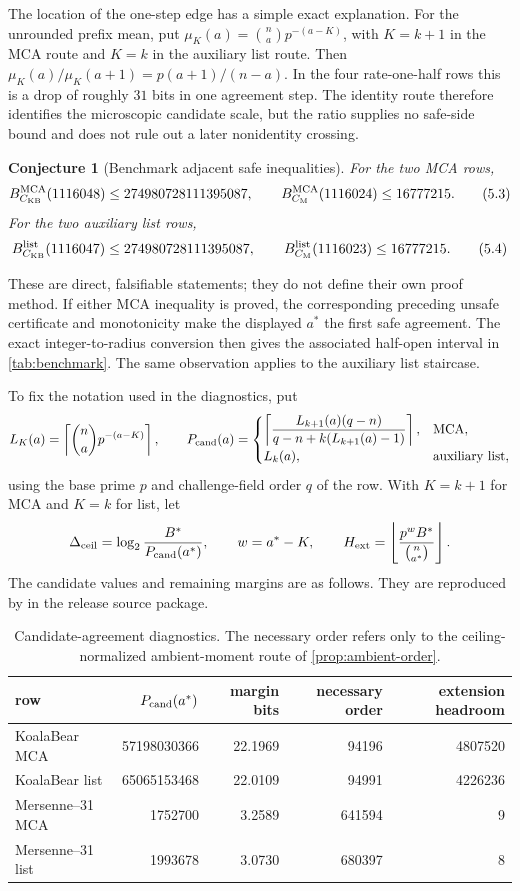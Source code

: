 \documentclass[a4paper,11pt]{amsart}
\newtheorem{conjecture}[theorem]{Conjecture}
\theoremstyle{remark}
\DeclareMathOperator{\MCA}{MCA}
\newcommand{\floor}[1]{\left\lfloor#1\right\rfloor}
\newcommand{\ceil}[1]{\left\lceil#1\right\rceil}
\begin{document}
The location of the one-step edge has a simple exact explanation.  For the
unrounded prefix mean, put
\(\mu_K(a)=\binom na p^{-(a-K)}\), with \(K=k+1\) in the MCA route and
\(K=k\) in the auxiliary list route.  Then
\(\mu_K(a)/\mu_K(a+1)=p(a+1)/(n-a)\).  In the four rate-one-half rows this
is a drop of roughly \(31\) bits in one agreement step.  The identity route
therefore identifies the microscopic candidate scale, but the ratio supplies
no safe-side bound and does not rule out a later nonidentity crossing.

\begin{conjecture}[Benchmark adjacent safe inequalities]\label{conj:benchmark}
For the two MCA rows,
\[
 B_{C_{\rm KB}}^{\MCA}(1116048)\le274980728111395087,
 \qquad
 B_{C_{\rm M}}^{\MCA}(1116024)\le16777215.           \tag{5.3}\label{eq:mca-adjacent}
\]
For the two auxiliary list rows,
\[
 B_{C_{\rm KB}}^{\rm list}(1116047)\le274980728111395087,
 \qquad
 B_{C_{\rm M}}^{\rm list}(1116023)\le16777215.      \tag{5.4}\label{eq:list-adjacent}
\]
\end{conjecture}

These are direct, falsifiable statements; they do not define their own proof
method.  If either MCA inequality is proved, the corresponding preceding
unsafe certificate and monotonicity make the displayed \(a^*\) the first safe
agreement.  The exact integer-to-radius conversion then gives the associated
half-open interval in \cref{tab:benchmark}.  The same observation applies to
the auxiliary list staircase.

To fix the notation used in the diagnostics, put
\[
 L_K(a)=\ceil{\binom na p^{-(a-K)}},\qquad
 P_{\rm cand}(a)=
 \begin{cases}
 \displaystyle\ceil{\frac{L_{k+1}(a)(q-n)}
 {q-n+k(L_{k+1}(a)-1)}},&\text{MCA},\\[6pt]
 L_k(a),&\text{auxiliary list},
 \end{cases}
\]
using the base prime \(p\) and challenge-field order \(q\) of the row.  With
\(K=k+1\) for MCA and \(K=k\) for list, let
\[
 \Delta_{\rm ceil}=\log_2\frac{B^*}{P_{\rm cand}(a^*)},\qquad
 w=a^*-K,\qquad
 H_{\rm ext}=\floor{\frac{p^wB^*}{\binom n{a^*}}}.
\]
The candidate values and remaining margins are as follows.  They are
reproduced by  in the release source package.

\begin{table}[t]
\centering
\small
\caption{Candidate-agreement diagnostics.  The necessary order refers only
to the ceiling-normalized ambient-moment route of
\cref{prop:ambient-order}.}\label{tab:diagnostics}
\begin{tabular}{@{}lrrrr@{}}
\toprule
row & \(P_{\rm cand}(a^*)\)& margin bits & necessary order & extension headroom\\
\midrule
KoalaBear MCA &57198030366&22.1969&94196&4807520\\
KoalaBear list&65065153468&22.0109&94991&4226236\\
Mersenne--31 MCA&1752700&3.2589&641594&9\\
Mersenne--31 list&1993678&3.0730&680397&8\\
\bottomrule
\end{tabular}
\end{table}
\end{document}
